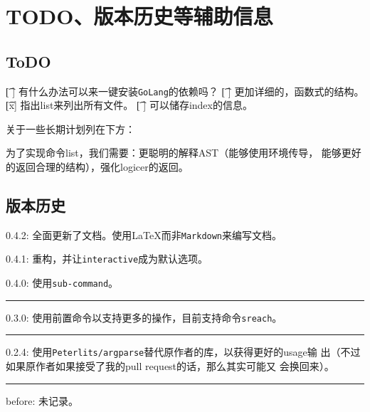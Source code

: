 \documentclass{peterlitsdoc}
\def\hline{\begingroup
    \noindent\pltgray\rule{\textwidth}{0.5pt}%
    \endgroup}
\begin{document}

\section{TODO、版本历史等辅助信息}

\subsection{ToDO}
\begin{plttodoenv}{1}
    \t[ ] 有什么办法可以来一键安装\verb|GoLang|的依赖吗？
    \t[ ] 更加详细的，函数式的结构。
    \t[x] 指出list来列出所有文件。
    \t[ ] 可以储存index的信息。
\end{plttodoenv}
\bigskip

关于一些长期计划列在下方：

为了实现命令list，我们需要：更聪明的解释AST（能够使用环境传导，
能够更好的返回合理的结构），强化logicer的返回。

\subsection{版本历史}

0.4.2: 全面更新了文档。使用\LaTeX{}而非\verb|Markdown|来编写文档。

0.4.1: 重构，并让\verb|interactive|成为默认选项。

0.4.0: 使用\verb|sub-command|。

\hline

0.3.0: 使用前置命令以支持更多的操作，目前支持命令\verb|sreach|。

\hline

0.2.4: 使用\verb|Peterlits/argparse|替代原作者的库，以获得更好的usage输
出（不过如果原作者如果接受了我的pull request的话，那么其实可能又
会换回来）。

\hline

before: 未记录。
\end{document}
